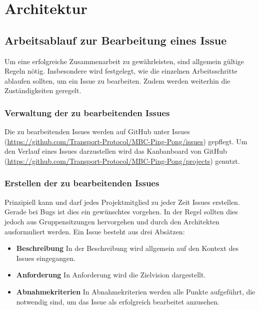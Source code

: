 \chapter{Architektur}

\section{Arbeitsablauf zur Bearbeitung eines Issue}
Um eine erfolgreiche Zusammenarbeit zu gewährleisten, sind allgemein gültige Regeln nötig. Insbesondere wird festgelegt, wie die einzelnen Arbeitsschritte ablaufen sollten, um ein Issue zu bearbeiten. Zudem werden weiterhin die Zuständigkeiten geregelt. 

\subsection{Verwaltung der zu bearbeitenden Issues}
Die zu bearbeitenden Issues werden auf GitHub unter Issues (\href{https://github.com/Transport-Protocol/MBC-Ping-Pong/issues}{https://github.com/Transport-Protocol/MBC-Ping-Pong/issues}) gepflegt. Um den Verlauf eines Issues darzustellen wird das Kanbanboard von GitHub (\href{https://github.com/Transport-Protocol/MBC-Ping-Pong/projects}{https://github.com/Transport-Protocol/MBC-Ping-Pong/projects}) genutzt.

\subsection{Erstellen der zu bearbeitenden Issues}
Prinzipiell kann und darf jedes Projektmitglied zu jeder Zeit Issues erstellen. Gerade bei Bugs ist dies ein gewünschtes vorgehen. In der Regel sollten dies jedoch aus Gruppensitzungen hervorgehen und durch den Architekten ausformuliert werden.\newline
Ein Issue besteht aus drei Absätzen:
\begin{itemize}
	\item \textbf{Beschreibung} \newline
	In der Beschreibung wird allgemein auf den Kontext des Issues eingegangen.
	\item \textbf{Anforderung} \newline
	In Anforderung wird die Zielvision dargestellt.
	\item \textbf{Abnahmekriterien} \newline
	In Abnahmekriterien werden alle Punkte aufgeführt, die notwendig sind, um das Issue als erfolgreich bearbeitet anzusehen.
\end{itemize}

